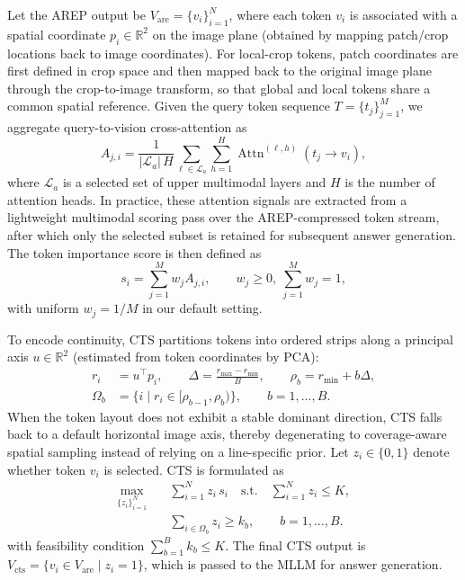 \documentclass[journal,twoside,web]{ieeecolor}
\begin{document}
Let the AREP output be $V_{\mathrm{are}}=\{v_i\}_{i=1}^{N}$, where each token $v_i$ is associated with a spatial coordinate $p_i\in\mathbb{R}^2$ on the image plane (obtained by mapping patch/crop locations back to image coordinates).
For local-crop tokens, patch coordinates are first defined in crop space and then mapped back to the original image plane through the crop-to-image transform, so that global and local tokens share a common spatial reference.
Given the query token sequence $T=\{t_j\}_{j=1}^{M}$, we aggregate query-to-vision cross-attention as
\begin{equation}
  A_{j,i}=\frac{1}{|\mathcal{L}_a|\,H}
  \sum_{\ell\in\mathcal{L}_a}\sum_{h=1}^{H}
  \operatorname{Attn}^{(\ell,h)}(t_j\!\rightarrow\! v_i),
  \label{eq:cts_attn}
\end{equation}
where $\mathcal{L}_a$ is a selected set of upper multimodal layers and $H$ is the number of attention heads.
In practice, these attention signals are extracted from a lightweight multimodal scoring pass over the AREP-compressed token stream, after which only the selected subset is retained for subsequent answer generation.
The token importance score is then defined as
\begin{equation}
  s_i=\sum_{j=1}^{M} w_j A_{j,i},
  \qquad w_j\ge 0,\ \sum_{j=1}^{M}w_j=1,
  \label{eq:cts_score}
\end{equation}
with uniform $w_j=1/M$ in our default setting.

To encode continuity, CTS partitions tokens into ordered strips along a principal axis $u\in\mathbb{R}^2$ (estimated from token coordinates by PCA):
\begin{equation}
  \begin{aligned}
    r_i &= u^\top p_i,\qquad
    \Delta = \frac{r_{\max}-r_{\min}}{B},\qquad
    \rho_b=r_{\min}+b\Delta,\\
    \Omega_b &= \{i\mid r_i\in[\rho_{b-1},\rho_b)\},\qquad b=1,\ldots,B.
  \end{aligned}
  \label{eq:cts_partition}
\end{equation}
When the token layout does not exhibit a stable dominant direction, CTS falls back to a default horizontal image axis, thereby degenerating to coverage-aware spatial sampling instead of relying on a line-specific prior.
Let $z_i\in\{0,1\}$ denote whether token $v_i$ is selected. CTS is formulated as
\begin{equation}
  \begin{aligned}
    \max_{\{z_i\}_{i=1}^{N}}\quad
    &\sum_{i=1}^{N} z_i\, s_i
    \quad \mathrm{s.t.}\quad
    \sum_{i=1}^{N} z_i \le K,\\
    &\sum_{i\in\Omega_b} z_i \ge k_b,\qquad b=1,\ldots,B.
  \end{aligned}
  \label{eq:cts_opt}
\end{equation}
with feasibility condition $\sum_{b=1}^{B}k_b\le K$.
The final CTS output is $V_{\mathrm{cts}}=\{v_i\in V_{\mathrm{are}}\mid z_i=1\}$, which is passed to the MLLM for answer generation.
\end{document}
